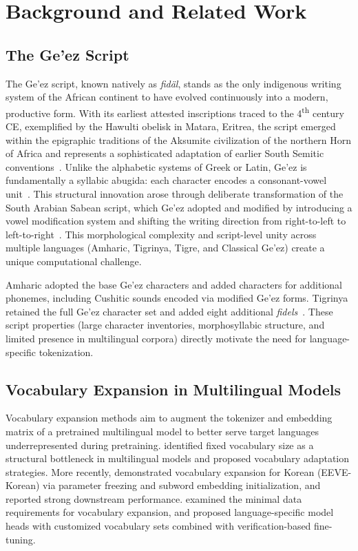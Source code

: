 \section{Background and Related Work}

\subsection{The Ge'ez Script}
The Ge'ez script, known natively as \textit{fidäl}, stands as the only indigenous writing system of the African continent to have evolved continuously into a modern, productive form. With its earliest attested inscriptions traced to the 4\textsuperscript{th} century CE, exemplified by the Hawulti obelisk in Matara, Eritrea, the script emerged within the epigraphic traditions of the Aksumite civilization of the northern Horn of Africa and represents a sophisticated adaptation of earlier South Semitic conventions~\cite{phillipson2012foundations,getatchew1996ethiopic}. Unlike the alphabetic systems of Greek or Latin, Ge'ez is fundamentally a syllabic abugida: each character encodes a consonant-vowel unit~\cite{getatchew1996ethiopic}. This structural innovation arose through deliberate transformation of the South Arabian Sabean script, which Ge'ez adopted and modified by introducing a vowel modification system and shifting the writing direction from right-to-left to left-to-right~\cite{getatchew1996ethiopic,gebremedhin2020linguistic}. This morphological complexity and script-level unity across multiple languages (Amharic, Tigrinya, Tigre, and Classical Ge'ez) create a unique computational challenge.

Amharic adopted the base Ge'ez characters and added characters for additional phonemes, including Cushitic sounds encoded via modified Ge'ez forms. Tigrinya retained the full Ge'ez character set and added eight additional \textit{fidels}~\cite{gebremedhin2020linguistic}. These script properties (large character inventories, morphosyllabic structure, and limited presence in multilingual corpora) directly motivate the need for language-specific tokenization.

\subsection{Vocabulary Expansion in Multilingual Models}
Vocabulary expansion methods aim to augment the tokenizer and embedding matrix of a pretrained multilingual model to better serve target languages underrepresented during pretraining. \citet{wang2019improving} identified fixed vocabulary size as a structural bottleneck in multilingual models and proposed vocabulary adaptation strategies. More recently, \citet{kim2024efficient} demonstrated vocabulary expansion for Korean (EEVE-Korean) via parameter freezing and subword embedding initialization, and reported strong downstream performance. \citet{yamaguchi2024how} examined the minimal data requirements for vocabulary expansion, and \citet{hong2024accelerating} proposed language-specific model heads with customized vocabulary sets combined with verification-based fine-tuning.

